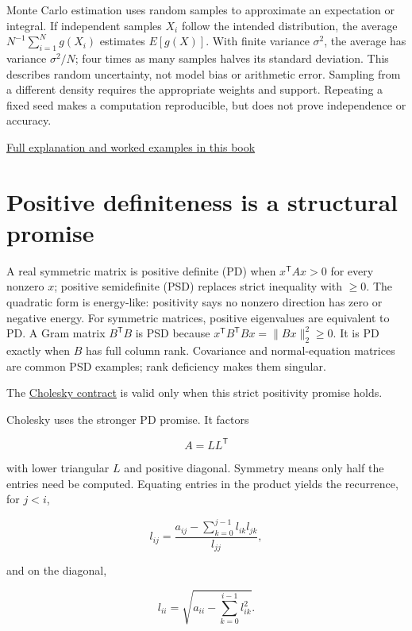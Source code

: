 Monte Carlo estimation uses random samples to approximate an expectation or integral. If independent samples \(X_i\) follow the intended distribution, the average \(N^{-1}\sum_{i=1}^N g(X_i)\) estimates \(E[g(X)]\). With finite variance \(\sigma^2\), the average has variance \(\sigma^2/N\); four times as many samples halves its standard deviation. This describes random uncertainty, not model bias or arithmetic error. Sampling from a different density requires the appropriate weights and support. Repeating a fixed seed makes a computation reproducible, but does not prove independence or accuracy.

\hyperref[02-foundations-ii-ch030-monte-carlo-estimates-trade-computation-for-uncertainty]{Full explanation and worked examples in this book}

\section{Positive definiteness is a structural promise}\label{01-foundations-i-ch020-positive-definiteness-is-a-structural-promise}

A real symmetric matrix is positive definite (PD) when \(x^\mathsf T A x>0\) for every nonzero \(x\); positive semidefinite (PSD) replaces strict inequality with \(\ge0\). The quadratic form is energy-like: positivity says no nonzero direction has zero or negative energy. For symmetric matrices, positive eigenvalues are equivalent to PD. A Gram matrix \(B^\mathsf T B\) is PSD because \(x^\mathsf T B^\mathsf T Bx=\|Bx\|_2^2\ge0\). It is PD exactly when \(B\) has full column rank. Covariance and normal-equation matrices are common PSD examples; rank deficiency makes them singular.

The \hyperref[01-foundations-i-ch020-positive-definiteness-is-a-structural-promise]{Cholesky contract} is valid only when this strict positivity promise holds.

Cholesky uses the stronger PD promise. It factors

\[
A=LL^\mathsf T
\]

with lower triangular \(L\) and positive diagonal. Symmetry means only half the entries need be computed. Equating entries in the product yields the recurrence, for \(j<i\),

\[
l_{ij}=\frac{a_{ij}-\sum_{k=0}^{j-1}l_{ik}l_{jk}}{l_{jj}},
\]

and on the diagonal,

\[
l_{ii}=\sqrt{a_{ii}-\sum_{k=0}^{i-1}l_{ik}^2}.
\]

